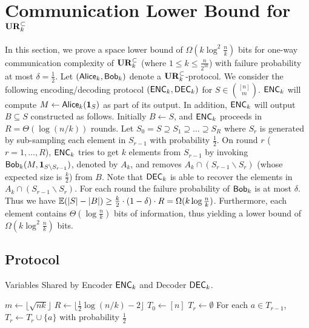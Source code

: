 \section{Communication Lower Bound for $\mathbf{UR}_k^\subset$}\label{sec:k-samples-lb}

In this section, we prove a space lower bound of $\Omega(k\log^2
\frac{n}{k})$ bits for one-way communication complexity of $\mathbf{UR}_k^\subset$ (where $1\le k \le \frac{n}{2^{10}}$) with failure probability at most $\delta = \frac{1}{2}$.
Let $(\mathsf{Alice}_k, \mathsf{Bob}_k)$ denote a $\mathbf{UR}_k^\subset$-protocol. 
We consider the following encoding/decoding protocol $(\textsf{ENC}_k, \textsf{DEC}_k)$ for $S\in {[n] \choose m}$. 
$\textsf{ENC}_k$ will compute $M\leftarrow \mathsf{Alice}_k(\mathbf{1}_S)$ as part of its output. 
In addition, $\textsf{ENC}_k$ will output $B\subseteq S$ constructed as follows.
Initially $B\leftarrow S$, and $\textsf{ENC}_k$ proceeds in $R=\Theta(\log (n/k))$ rounds. 
Let $S_0=S\supseteq S_1\supseteq \ldots \supseteq S_R$ where $S_r$ is generated by sub-sampling each element in $S_{r-1}$ with probability $\frac{1}{2}$. 
On round $r$ ($r=1,\ldots, R$), $\textsf{ENC}_k$ tries to get $k$ elements from $S_{r-1}$ by invoking $\mathsf{Bob}_k(M, \mathbf{1}_{S\backslash S_{r-1}})$, denoted by $A_k$, and removes $A_k\cap (S_{r-1}\backslash S_{r})$ (whose expected size is $\frac{k}{2}$) from $B$. 
Note that $\textsf{DEC}_k$ is able to recover the elements in $A_k\cap (S_{r-1}\backslash S_{r})$. 
For each round the failure probability of $\mathsf{Bob}_k$ is at most $\delta$. 
Thus we have $\operatorname*{\mathbb{E}}(|S|-|B|)\ge \frac{k}{2}\cdot (1-\delta) \cdot R=\Omega(k\log\frac{n}{k})$. 
Furthermore, each element contains $\Theta(\log \frac{n}{k})$ bits of information, thus yielding a lower bound of $\Omega(k\log^2\frac{n}{k})$ bits.

\subsection{Protocol}
\begin{algorithm}[H] 
  \caption{Variables Shared by Encoder $\textsf{ENC}_k$ and Decoder $\textsf{DEC}_k$.} \label{algo:para4}
  \begin{algorithmic}[1] 
    \State $m\leftarrow \lfloor \sqrt{nk} \rfloor$
    \State $R\leftarrow \lfloor \frac{1}{2}\log (n/k) - 2 \rfloor$ 
    \State $T_0\leftarrow [n]$
      \State $T_r\leftarrow \emptyset$
      \State For each $a\in T_{r-1}$, $T_r\leftarrow T_r\cup \{a\}$ with probability $\frac{1}{2}$ 
    \EndFor
  \end{algorithmic}
\end{algorithm}

